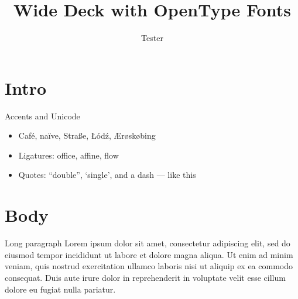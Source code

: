 \documentclass[aspectratio=169]{beamer}
\title{Wide Deck with OpenType Fonts}
\author{Tester}
\date{}
\begin{document}
\begin{frame}
  \titlepage
\end{frame}

\section{Intro}
\begin{frame}{Accents and Unicode}
  \begin{itemize}
    \item Café, naïve, Straße, Łódź, Ærøskøbing
    \item Ligatures: office, affine, flow
    \item Quotes: “double”, ‘single’, and a dash — like this
  \end{itemize}
\end{frame}

\section{Body}
\begin{frame}{Long paragraph}
  Lorem ipsum dolor sit amet, consectetur adipiscing elit, sed do eiusmod tempor
  incididunt ut labore et dolore magna aliqua. Ut enim ad minim veniam, quis
  nostrud exercitation ullamco laboris nisi ut aliquip ex ea commodo consequat.
  Duis aute irure dolor in reprehenderit in voluptate velit esse cillum dolore
  eu fugiat nulla pariatur.
\end{frame}
\end{document}

